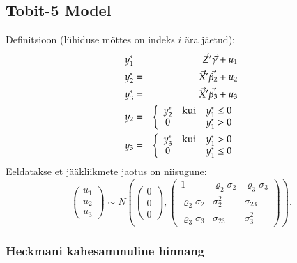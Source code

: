 \documentclass[a4paper]{article}
\numberwithin{equation}{subsection}
\begin{document}
\clearpage

\subsection{Tobit-5 Model}

Definitsioon (lühiduse mõttes on indeks $i$ ära jäetud):
\begin{eqnarray}
y_1^* &=& \vec{Z}'\vec{\gamma} + u_1\\
y_2^* &=& \vec{X}'\vec{\beta_2} + u_2\\
y_3^* &=& \vec{X}'\vec{\beta_3} + u_3\\
y_2 &=& \left\{
 \begin{array}{c@{\quad}l@{\quad}l}
 y_2^*  & \mathrm{kui}  & y_1^* \le 0\\
 0      &               & y_1^* > 0
 \end{array} \right.\\
y_3 &=& \left\{
 \begin{array}{c@{\quad}l@{\quad}l}
 y_3^*  & \mathrm{kui}  & y_1^* > 0\\
 0      &               & y_1^* \le 0
 \end{array}\right.
\end{eqnarray}
Eeldatakse et jääkliikmete jaotus on niisugune:
\begin{equation} \left(
 \begin{array}{c}
 u_1\\
 u_2\\
 u_3
 \end{array} \right) \sim N \left(
 \left( \begin{array}{c}
 0 \\
 0 \\
 0
 \end{array} \right),
 \left( \begin{array}{ccc}
 1                      & \varrho_2\sigma_2     & \varrho_3\sigma_3\\
 \varrho_2\sigma_2      & \sigma^2_2            & \sigma_{23}\\
 \varrho_3\sigma_3      & \sigma_{23}           & \sigma^2_3
 \end{array} \right) \right).
\end{equation}


\subsubsection{Heckmani kahesammuline hinnang}
\end{document}
